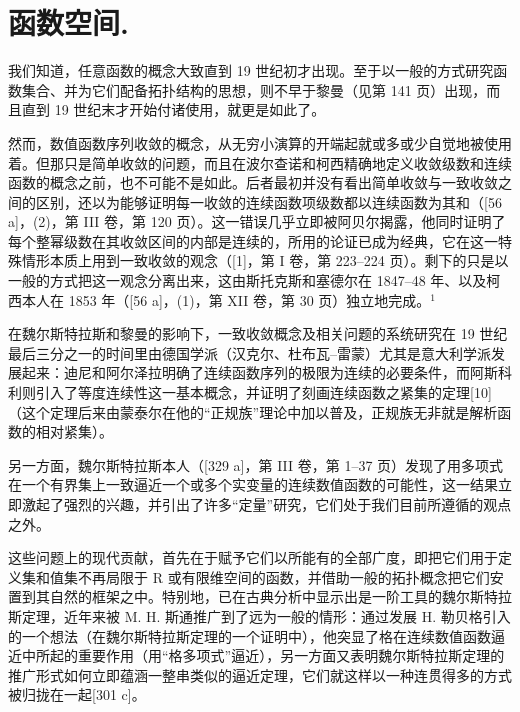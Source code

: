 \chapter{函数空间.}

我们知道，任意函数的概念大致直到 19 世纪初才出现。至于以一般的方式研究函数集合、并为它们配备拓扑结构的思想，则不早于黎曼（见第 141 页）出现，而且直到 19 世纪末才开始付诸使用，就更是如此了。

然而，数值函数序列收敛的概念，从无穷小演算的开端起就或多或少自觉地被使用着。但那只是简单收敛的问题，而且在波尔查诺和柯西精确地定义收敛级数和连续函数的概念之前，也不可能不是如此。后者最初并没有看出简单收敛与一致收敛之间的区别，还以为能够证明每一收敛的连续函数项级数都以连续函数为其和（{[}56 a{]}，(2)，第 III 卷，第 120 页）。这一错误几乎立即被阿贝尔揭露，他同时证明了每个整幂级数在其收敛区间的内部是连续的，所用的论证已成为经典，它在这一特殊情形本质上用到一致收敛的观念（{[}1{]}，第 I 卷，第 223–224 页）。剩下的只是以一般的方式把这一观念分离出来，这由斯托克斯和塞德尔在 1847–48 年、以及柯西本人在 1853 年（{[}56 a{]}，(1)，第 XII 卷，第 30 页）独立地完成。\(^{1}\)

在魏尔斯特拉斯和黎曼的影响下，一致收敛概念及相关问题的系统研究在 19 世纪最后三分之一的时间里由德国学派（汉克尔、杜布瓦–雷蒙）尤其是意大利学派发展起来：迪尼和阿尔泽拉明确了连续函数序列的极限为连续的必要条件，而阿斯科利则引入了等度连续性这一基本概念，并证明了刻画连续函数之紧集的定理{[}10{]}（这个定理后来由蒙泰尔在他的“正规族”理论中加以普及，正规族无非就是解析函数的相对紧集）。

另一方面，魏尔斯特拉斯本人（{[}329 a{]}，第 III 卷，第 1–37 页）发现了用多项式在一个有界集上一致逼近一个或多个实变量的连续数值函数的可能性，这一结果立即激起了强烈的兴趣，并引出了许多“定量”研究，它们处于我们目前所遵循的观点之外。

这些问题上的现代贡献，首先在于赋予它们以所能有的全部广度，即把它们用于定义集和值集不再局限于 R 或有限维空间的函数，并借助一般的拓扑概念把它们安置到其自然的框架之中。特别地，已在古典分析中显示出是一阶工具的魏尔斯特拉斯定理，近年来被 M. H. 斯通推广到了远为一般的情形：通过发展 H. 勒贝格引入的一个想法（在魏尔斯特拉斯定理的一个证明中），他突显了格在连续数值函数逼近中所起的重要作用（用“格多项式”逼近），另一方面又表明魏尔斯特拉斯定理的推广形式如何立即蕴涵一整串类似的逼近定理，它们就这样以一种连贯得多的方式被归拢在一起{[}301 c{]}。

